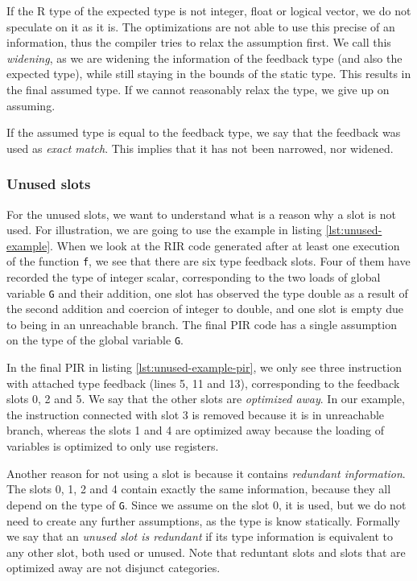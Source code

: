 If the R type of the expected type is not integer, float or logical vector, we do not speculate on it as it is. The optimizations are not able to use this precise of an information, thus the compiler tries to relax the assumption first. We call this \textit{widening}, as we are widening the information of the feedback type (and also the expected type), while still staying in the bounds of the static type. This results in the final assumed type. If we cannot reasonably relax the type, we give up on assuming.

If the assumed type is equal to the feedback type, we say that the feedback was used as \textit{exact match}. This implies that it has not been narrowed, nor widened.

\subsubsection*{Unused slots}

For the unused slots, we want to understand what is a reason why a slot is not used. For illustration, we are going to use the example in listing \ref{lst:unused-example}. When we look at the RIR code generated after at least one execution of the function \texttt{f}, we see that there are six type feedback slots. Four of them have recorded the type of integer scalar, corresponding to the two loads of global variable \texttt{G} and their addition, one slot has observed the type double as a result of the second addition and coercion of integer to double, and one slot is empty due to being in an unreachable branch. The final PIR code has a single assumption on the type of the global variable \texttt{G}.

In the final PIR in listing \ref{lst:unused-example-pir}, we only see three instruction with attached type feedback (lines 5, 11 and 13), corresponding to the feedback slots 0, 2 and 5. We say that the other slots are \textit{optimized away}. In our example, the instruction connected with slot 3 is removed because it is in unreachable branch, whereas the slots 1 and 4 are optimized away because the loading of variables is optimized to only use registers.

Another reason for not using a slot is because it contains \textit{redundant information}. The slots 0, 1, 2 and 4 contain exactly the same information, because they all depend on the type of \texttt{G}. Since we assume on the slot 0, it is used, but we do not need to create any further assumptions, as the type is know statically. Formally we say that an \textit{unused slot is redundant} if its type information is equivalent to any other slot, both used or unused. Note that reduntant slots and slots that are optimized away are not disjunct categories.

